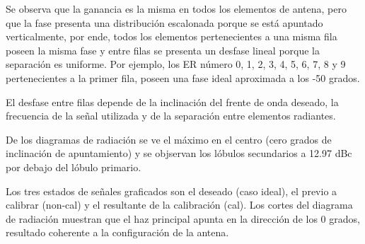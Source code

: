 Se observa que la ganancia es la misma en todos los elementos de antena, pero que la fase presenta una distribución escalonada
porque se está apuntado verticalmente, por ende, todos los elementos pertenecientes a una misma fila poseen la misma fase y entre
filas se presenta un desfase lineal porque la separación es uniforme. Por ejemplo, los ER número 0, 1, 2, 3, 4, 5, 6, 7, 8 y 9
pertenecientes a la primer fila, poseen una fase ideal aproximada a los -50 grados.

El desfase entre filas depende de la inclinación del frente de onda deseado, la frecuencia de la señal utilizada y de la
separación entre elementos radiantes.

De los diagramas de radiación se ve el máximo en el centro (cero grados de inclinación de apuntamiento) y se objservan los
lóbulos secundarios a 12.97 dBc por debajo del lóbulo primario.

Los tres estados de señales graficados son el deseado (caso ideal), el previo a calibrar (non-cal) y el resultante de la
calibración (cal). Los cortes del diagrama de radiación muestran que el haz principal apunta en la dirección de los 0 grados,
resultado coherente a la configuración de la antena.

